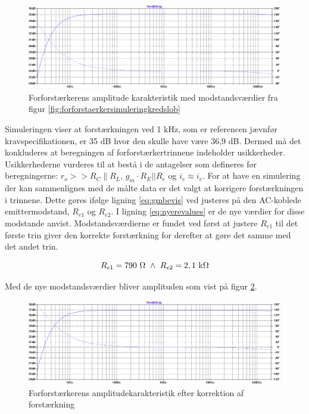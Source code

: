\begin{figure}[h]
\centering
\includegraphics[width=\textwidth]{teknisk/forforstaerker/amplitudeforforstaerker.png}
\caption{Forforstærkerens amplitude karakteristik med modstandsværdier fra figur \ref{fig:forforstaerkersimuleringkredslob}}
\label{fig:amplitude-forforstaerker}
\end{figure}

Simuleringen viser at forstærkningen ved 1 kHz, som er referencen jævnfør kravspecifikationen, er 35 dB hvor den skulle have være 36,9 dB. Dermed må det konkluderes at beregningen af forforstærkertrinnene indeholder usikkerheder. Usikkerhederne vurderes til at bestå i de antagelser som defineres før beregningerne: $r_o >>R_C \| R_L$, $g_m \cdot R_E||R_e$ og $i_e \approx i_c$. For at have en simulering der kan sammenlignes med de målte data er det valgt at korrigere forstærkningen i trinnene. Dette gøres ifølge ligning \ref{eq:gmbevis} ved justeres på den AC-koblede emittermodstand, $R_{e1}$ og $R_{e2}$. I ligning \ref{eq:nyerevalues} er de nye værdier for disse modstande anvist. Modstandsværdierne er fundet ved først at justere $R_{e1}$ til det første trin giver den korrekte forstærkning for derefter at gøre det samme med det andet trin.

\begin{equation}
R_{e1}=790~\ohm~\wedge ~R_{e2}=2,1~\mathrm{k}\ohm
\label{eq:nyerevalues}
\end{equation}

Med de nye modstandsværdier bliver amplituden som vist på figur \ref{fig:rigtigamplitudeforforstaerker}.

\begin{figure}[h]
\centering
\includegraphics[width=\textwidth]{teknisk/forforstaerker/rigtigamplitude.png}
\caption{Forforstærkerens amplitudekarakteristik efter korrektion af forstærkning}
\label{fig:rigtigamplitudeforforstaerker}
\end{figure}

